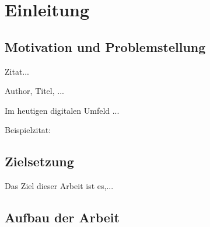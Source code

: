 \chapter{Einleitung}
\label{chap:einleitung}

\section{Motivation und Problemstellung}
\label{sec:motivation-und-problemstellung}

\epigraph{Zitat...}{Author, Titel, ...}

Im heutigen digitalen Umfeld ...

Beispielzitat: \cite{einstein}


\section{Zielsetzung}
\label{sec:zielsetzung}
Das Ziel dieser Arbeit ist es,...

\section{Aufbau der Arbeit}
\label{sec:struktur}
